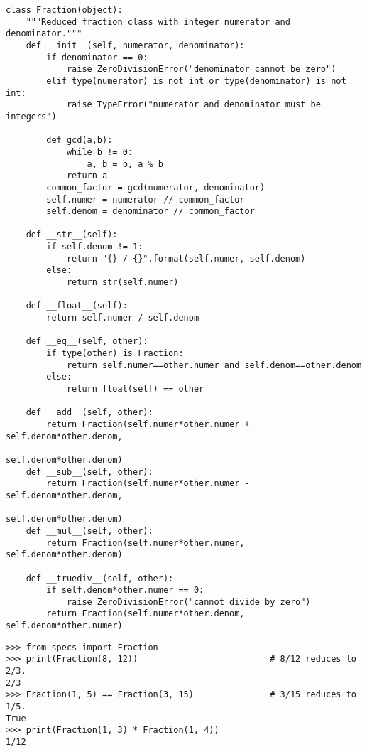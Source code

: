 \begin{lstlisting}
class Fraction(object):
    """Reduced fraction class with integer numerator and denominator."""
    def __init__(self, numerator, denominator):
        if denominator == 0:
            raise ZeroDivisionError("denominator cannot be zero")
        elif type(numerator) is not int or type(denominator) is not int:
            raise TypeError("numerator and denominator must be integers")

        def gcd(a,b):
            while b != 0:
                a, b = b, a % b
            return a
        common_factor = gcd(numerator, denominator)
        self.numer = numerator // common_factor
        self.denom = denominator // common_factor

    def __str__(self):
        if self.denom != 1:
            return "{} / {}".format(self.numer, self.denom)
        else:
            return str(self.numer)

    def __float__(self):
        return self.numer / self.denom

    def __eq__(self, other):
        if type(other) is Fraction:
            return self.numer==other.numer and self.denom==other.denom
        else:
            return float(self) == other

    def __add__(self, other):
        return Fraction(self.numer*other.numer + self.denom*other.denom,
                                                        self.denom*other.denom)
    def __sub__(self, other):
        return Fraction(self.numer*other.numer - self.denom*other.denom,
                                                        self.denom*other.denom)
    def __mul__(self, other):
        return Fraction(self.numer*other.numer, self.denom*other.denom)

    def __truediv__(self, other):
        if self.denom*other.numer == 0:
            raise ZeroDivisionError("cannot divide by zero")
        return Fraction(self.numer*other.denom, self.denom*other.numer)
\end{lstlisting}


\begin{lstlisting}
>>> from specs import Fraction
>>> print(Fraction(8, 12))                          # 8/12 reduces to 2/3.
2/3
>>> Fraction(1, 5) == Fraction(3, 15)               # 3/15 reduces to 1/5.
True
>>> print(Fraction(1, 3) * Fraction(1, 4))
1/12
\end{lstlisting}

